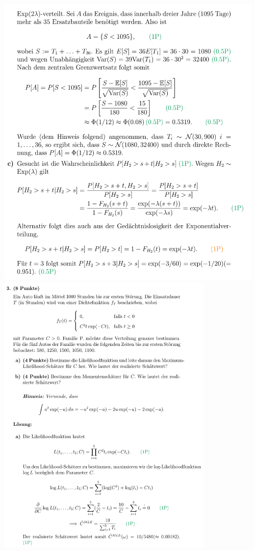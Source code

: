 \includegraphics[width=0.8\linewidth]{old_exams_prtsrc/sch_infk_so19_ml-06.png}\newline
\includegraphics[height=143mm]{old_exams_prtsrc/sch_infk_so19_ml-07.png}\newline
